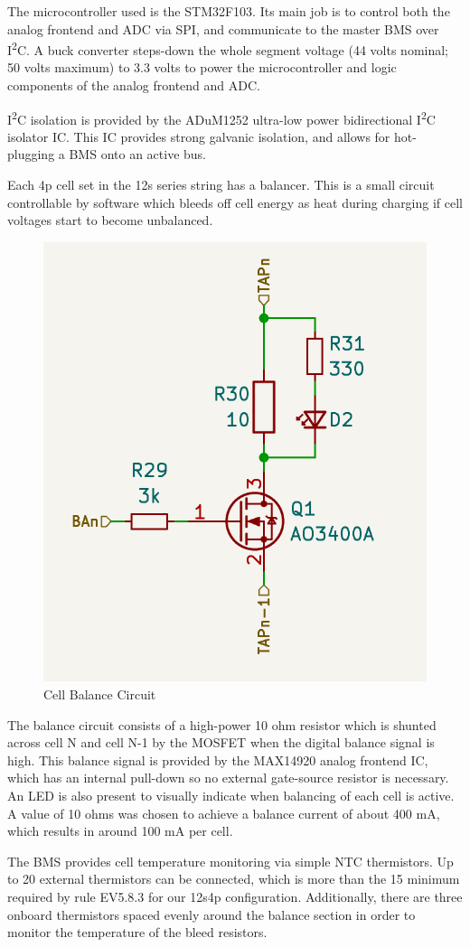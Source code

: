 \documentclass[12pt]{article}
\newcommand{\iic}{I\textsuperscript{2}C}
\begin{document}
The microcontroller used is the STM32F103.
Its main job is to control both the analog frontend and ADC via SPI, and communicate to the master BMS over \iic{}.
A buck converter steps-down the whole segment voltage (44 volts nominal; 50 volts maximum) to 3.3 volts to power the microcontroller and logic components of the analog frontend and ADC.

\iic{} isolation is provided by the ADuM1252 ultra-low power bidirectional \iic{} isolator IC.
This IC provides strong galvanic isolation, and allows for hot-plugging a BMS onto an active bus.

Each 4p cell set in the 12s series string has a balancer.
This is a small circuit controllable by software which bleeds off cell energy as heat during charging if cell voltages start to become unbalanced.

\begin{figure}[H]
  \centering
  \includegraphics[width=0.5\linewidth]{balance.png}
  \caption{Cell Balance Circuit}
  \label{fig:bms-balance-circuit}
\end{figure}

The balance circuit consists of a high-power 10 ohm resistor which is shunted across cell N and cell N-1 by the MOSFET when the digital balance signal is high.
This balance signal is provided by the MAX14920 analog frontend IC, which has an internal pull-down so no external gate-source resistor is necessary.
An LED is also present to visually indicate when balancing of each cell is active.
A value of 10 ohms was chosen to achieve a balance current of about 400 mA, which results in around 100 mA per cell.

The BMS provides cell temperature monitoring via simple NTC thermistors.
Up to 20 external thermistors can be connected, which is more than the 15 minimum required by rule EV5.8.3 for our 12s4p configuration.
Additionally, there are three onboard thermistors spaced evenly around the balance section in order to monitor the temperature of the bleed resistors.
\end{document}
